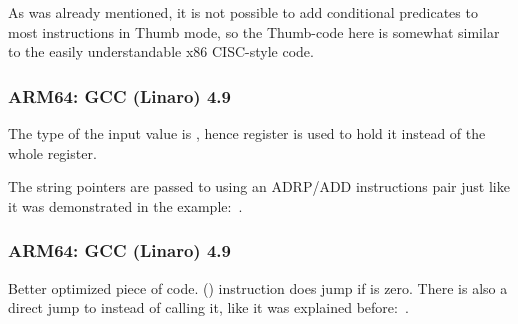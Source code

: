 As was already mentioned, it is not possible to add conditional predicates to most instructions in Thumb
mode, so the Thumb-code here is somewhat similar to the easily understandable x86 \ac{CISC}-style code.

\subsubsection{ARM64: \NonOptimizing GCC (Linaro) 4.9}



The type of the input value is \Tint, hence register  is used to hold it instead of the whole
 register.

The string pointers are passed to \puts using an ADRP/ADD instructions pair just like it was demonstrated in the 
\q{\HelloWorldSectionName} example:~.

\subsubsection{ARM64: \Optimizing GCC (Linaro) 4.9}



Better optimized piece of code.
 () instruction does jump if  is zero.
There is also a direct jump to \puts instead of calling it, like it was explained before:~.


